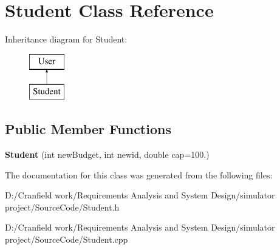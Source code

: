 \hypertarget{class_student}{}\section{Student Class Reference}
\label{class_student}
Inheritance diagram for Student\+:\begin{figure}[H]
\begin{center}
\leavevmode
\includegraphics[height=2.000000cm]{class_student}
\end{center}
\end{figure}
\subsection*{Public Member Functions}
\begin{DoxyCompactItemize}
\item 
\mbox{\label{class_student_a2d774a1d93be9037e9fcbda9750b9e33}} 
{\bfseries Student} (int new\+Budget, int newid, double cap=100.)
\end{DoxyCompactItemize}


The documentation for this class was generated from the following files\+:\begin{DoxyCompactItemize}
\item 
D\+:/\+Cranfield work/\+Requirements Analysis and System Design/simulator project/\+Source\+Code/Student.\+h\item 
D\+:/\+Cranfield work/\+Requirements Analysis and System Design/simulator project/\+Source\+Code/Student.\+cpp\end{DoxyCompactItemize}
